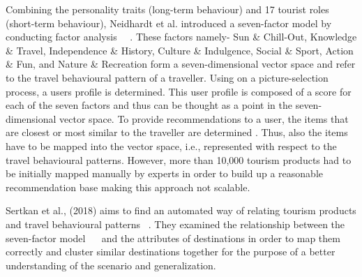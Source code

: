 Combining the personality traits (long-term behaviour) and 17 tourist roles (short-term behaviour), Neidhardt et al. introduced a seven-factor model by conducting factor analysis~\cite{neidhardt2015picture} ~\cite{neidhardt2014eliciting}. These factors namely- Sun \& Chill-Out, Knowledge \& Travel, Independence \& History, Culture \& Indulgence, Social \& Sport, Action \& Fun, and Nature \& Recreation form a seven-dimensional vector space and refer to the travel behavioural pattern of a traveller.  Using on a picture-selection process, a user\textquotesingle s profile is determined. This user profile is composed of a score for each of the seven factors and thus can be thought as a point in the seven-dimensional vector space. To provide recommendations to a user, the items that are closest or most similar to the traveller are determined . Thus, also the items have to be mapped into the vector space, i.e., represented with respect to the travel behavioural patterns. However, more than 10,000 tourism products had to be initially mapped manually by experts in order to build up a reasonable recommendation base making this approach not scalable.


Sertkan et al., (2018) aims to find an automated way of relating tourism products and travel behavioural patterns ~\cite{sertkan2018mapping}. They examined the relationship between the seven-factor model ~\cite{neidhardt2015picture}~\cite{neidhardt2014eliciting}  and the attributes of destinations in order to map them correctly and cluster similar destinations together for the purpose of a better understanding of the scenario and generalization.


